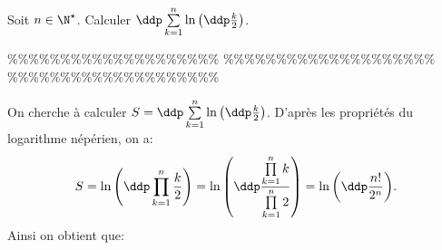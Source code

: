 



\begin{exercice} \; 
Soit $n\in\N^{\star}$. Calculer $\ddp \sum\limits_{k=1}^n \ln{\left( \ddp\frac{k}{2}  \right)}$.
\end{exercice}


\%\%\%\%\%\%\%\%\%\%\%\%\%\%\%\%\%\%\%\%
\%\%\%\%\%\%\%\%\%\%\%\%\%\%\%\%\%\%\%\%
\%\%\%\%\%\%\%\%\%\%\%\%\%\%\%\%\%\%\%\%



\begin{correction}  \; 
On cherche \`{a} calculer $S=\ddp \sum\limits_{k=1}^n \ln{\left( \ddp\frac{k}{2}  \right)}$.  D'apr\`{e}s les propri\'et\'es du logarithme n\'ep\'erien, on a: 
$$S=\ln{\left( \ddp \prod\limits_{k=1}^n \frac{k}{2} \right)} = \ln{\left( \ddp \frac{\prod\limits_{k=1}^n k}{\prod\limits_{k=1}^n 2}  \right)} =  \ln{\left( \ddp \frac{n!}{2^n}\right)}.$$
Ainsi on obtient que: 
\end{correction}

